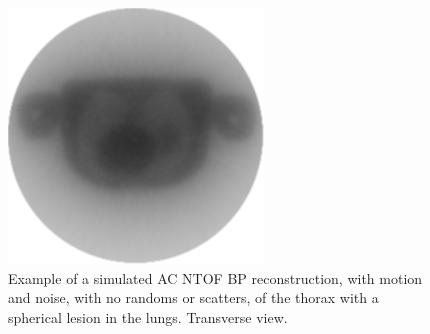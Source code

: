             \begin{figure}
                \centering
                
                \includegraphics[width=1.0\linewidth]{figures/background_bp_example.png}
                
                \captionsetup{singlelinecheck=false, justification=raggedright}
                \caption{Example of a simulated \gls{AC} \gls{NTOF} \gls{BP} reconstruction, with motion and noise, with no randoms or scatters, of the thorax with a spherical lesion in the lungs. Transverse view.}
                \label{fig:analytic_image_reconstruction_bp_example}
            \end{figure}
            
